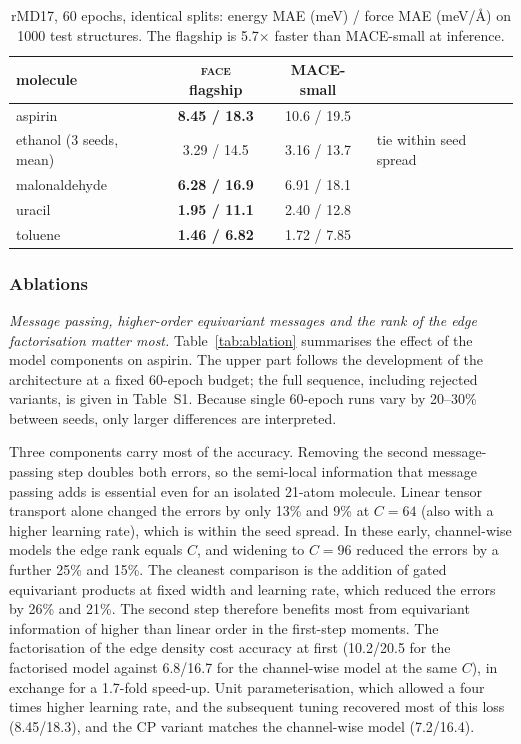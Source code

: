 \documentclass[journal=jctcce,manuscript=article,layout=traditional]{achemso}
\newcommand{\FACE}{\textup{\textsc{face}}}
\begin{document}
\begin{table}
\caption{rMD17, 60 epochs, identical splits: energy MAE (meV) / force MAE (meV/\AA) on 1000 test structures. The
flagship is 5.7$\times$ faster than MACE-small at inference.}
\label{tab:suite}
\begin{tabular}{lccl}
\toprule
molecule & \FACE{} flagship & MACE-small & \\
\midrule
aspirin       & \textbf{8.45 / 18.3} & 10.6 / 19.5 & \\
ethanol (3 seeds, mean) & 3.29 / 14.5 & 3.16 / 13.7 & tie within seed spread \\
malonaldehyde & \textbf{6.28 / 16.9} & 6.91 / 18.1 & \\
uracil        & \textbf{1.95 / 11.1} & 2.40 / 12.8 & \\
toluene       & \textbf{1.46 / 6.82} & 1.72 / 7.85 & \\
\bottomrule
\end{tabular}
\end{table}

\subsubsection{Ablations}
\label{sec:ablation}
\emph{Message passing, higher-order equivariant messages and the rank of the edge factorisation matter most.}
Table~\ref{tab:ablation} summarises the effect of the model components on aspirin. The upper part follows the
development of the architecture at a fixed 60-epoch budget; the full sequence, including rejected variants, is
given in Table~S1. Because single 60-epoch runs vary by 20--30\% between seeds, only larger differences are
interpreted.

Three components carry most of the accuracy. Removing the second message-passing step doubles both errors, so the
semi-local information that message passing adds is essential even for an isolated 21-atom molecule. Linear tensor
transport alone changed the errors by only 13\% and 9\% at $C=64$ (also with a higher learning rate), which is within
the seed spread. In these early, channel-wise models the edge rank equals $C$, and widening to $C=96$ reduced the
errors by a further 25\% and 15\%. The cleanest comparison is the addition of gated equivariant products at fixed
width and learning rate, which reduced the errors by 26\% and 21\%. The second step therefore benefits most from
equivariant information of higher than linear order in the first-step moments. The factorisation of the edge density cost accuracy at first
(10.2/20.5 for the factorised model against 6.8/16.7 for the channel-wise model at the same $C$), in exchange for a
1.7-fold speed-up. Unit parameterisation, which allowed a four times higher learning rate, and the subsequent tuning
recovered most of this loss (8.45/18.3), and the CP variant matches the channel-wise model (7.2/16.4).
\end{document}
